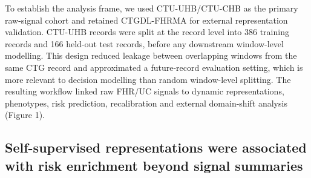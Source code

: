 \documentclass[11pt]{article}
\begin{document}
To establish the analysis frame, we used CTU-UHB/CTU-CHB as the primary raw-signal cohort and retained CTGDL-FHRMA for external representation validation. CTU-UHB records were split at the record level into 386 training records and 166 held-out test records, before any downstream window-level modelling. This design reduced leakage between overlapping windows from the same CTG record and approximated a future-record evaluation setting, which is more relevant to decision modelling than random window-level splitting. The resulting workflow linked raw FHR/UC signals to dynamic representations, phenotypes, risk prediction, recalibration and external domain-shift analysis (Figure 1).

\subsection{Self-supervised representations were associated with risk enrichment beyond signal summaries}
\end{document}
